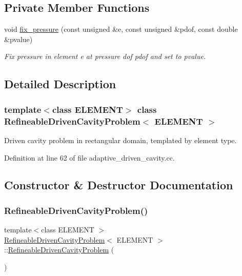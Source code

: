 \subsection*{Private Member Functions}
\begin{DoxyCompactItemize}
\item 
void \hyperlink{classRefineableDrivenCavityProblem_adaf562f21e050496c5390e10bdb39889}{fix\+\_\+pressure} (const unsigned \&e, const unsigned \&pdof, const double \&pvalue)
\begin{DoxyCompactList}\small\item\em Fix pressure in element e at pressure dof pdof and set to pvalue. \end{DoxyCompactList}\end{DoxyCompactItemize}


\subsection{Detailed Description}
\subsubsection*{template$<$class E\+L\+E\+M\+E\+NT$>$\newline
class Refineable\+Driven\+Cavity\+Problem$<$ E\+L\+E\+M\+E\+N\+T $>$}

Driven cavity problem in rectangular domain, templated by element type. 

Definition at line 62 of file adaptive\+\_\+driven\+\_\+cavity.\+cc.



\subsection{Constructor \& Destructor Documentation}
\mbox{\label{classRefineableDrivenCavityProblem_aef71ddbff081a1f9c7f5484a6c80598a}} 
\subsubsection{\texorpdfstring{Refineable\+Driven\+Cavity\+Problem()}{RefineableDrivenCavityProblem()}}
{\footnotesize\ttfamily template$<$class E\+L\+E\+M\+E\+NT $>$ \\
\hyperlink{classRefineableDrivenCavityProblem}{Refineable\+Driven\+Cavity\+Problem}$<$ E\+L\+E\+M\+E\+NT $>$\+::\hyperlink{classRefineableDrivenCavityProblem}{Refineable\+Driven\+Cavity\+Problem} (\begin{DoxyParamCaption}{ }\end{DoxyParamCaption})}



